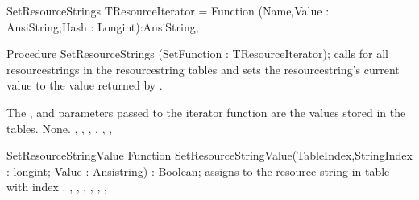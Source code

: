 \documentclass{report}
\begin{document}
\begin{procedure}{SetResourceStrings}
\Declaration
TResourceIterator =  Function (Name,Value : AnsiString;Hash : Longint):AnsiString;

Procedure SetResourceStrings (SetFunction :  TResourceIterator);
\Description
{} calls  for all resourcestrings
in the resourcestring tables and sets the resourcestring's current value 
to the value returned by . 

The , and  parameters passed to the iterator 
function are the values stored in the tables.
\Errors
None.
\SeeAlso
{},
,
,
,
,
,
\end{procedure}


\begin{function}{SetResourceStringValue}
\Declaration
Function SetResourceStringValue(TableIndex,StringIndex : longint; Value : Ansistring) : Boolean;   
\Description
{} assigns  to the resource string in 
table  with index .
\Errors
\SeeAlso
{},
,
,
,
,
,
\end{function}



%
%
\printindex
\end{document}
